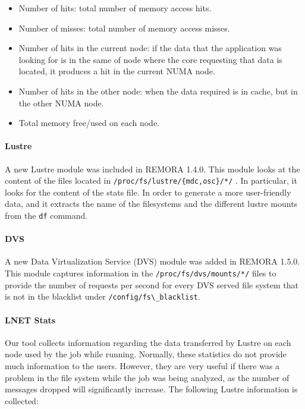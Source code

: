 \documentclass[10pt,a4paper]{report}
\begin{document}
\begin{itemize}
	\item Number of hits: total number of memory access hits. 
	\item Number of misses: total number of memory access misses. 
	\item Number of hits in the current node: if the data that the application was looking for is in the same of node where the core requesting that data is located, it produces a hit in the current NUMA node.
	\item Number of hits in the other node: when the data required is in cache, but in the other NUMA node.
	\item Total memory free/used on each node.
\end{itemize}


\paragraph{Lustre} 

A new Lustre module was included in REMORA 1.4.0. This module looks at the content of the files located in \verb+/proc/fs/lustre/{mdc,osc}/*/+ . In particular, it looks for the content of the stats file. In order to generate a more user-friendly data, and it extracts the name of the filesystems and the different lustre mounts from the \texttt{df} command.

\paragraph{DVS}

A new Data Virtualization Service (DVS) module was added in REMORA 1.5.0. This module captures information in the \verb+/proc/fs/dvs/mounts/*/+ files to provide the number of requests per second for every DVS served file system that is not in the blacklist under \verb+/config/fs\_blacklist+.


\paragraph{LNET Stats}
Our tool collects information regarding the data transferred by Lustre on each node used by the job while running. Normally, these statistics do not provide much information to the users. However, they are very useful if there was a problem in the file system while the job was being analyzed, as the number of messages dropped will significantly increase. The following Lustre information is collected:
\end{document}
